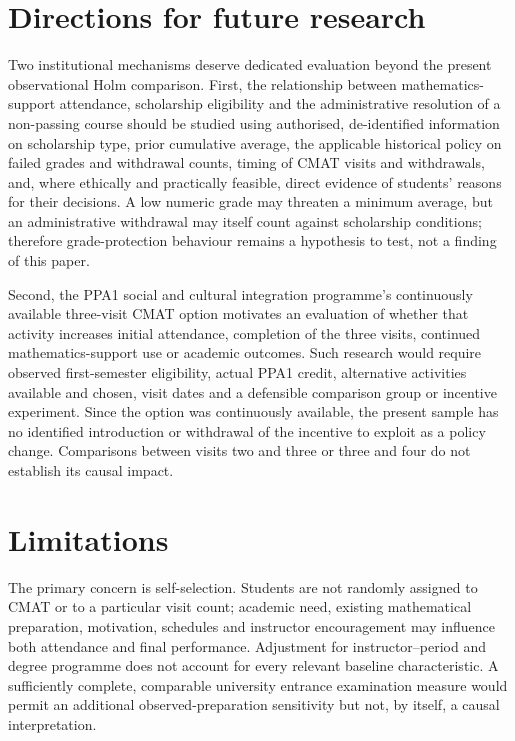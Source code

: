 \section{Directions for future research}

Two institutional mechanisms deserve dedicated evaluation beyond the present observational Holm comparison. First, the relationship between mathematics-support attendance, scholarship eligibility and the administrative resolution of a non-passing course should be studied using authorised, de-identified information on scholarship type, prior cumulative average, the applicable historical policy on failed grades and withdrawal counts, timing of CMAT visits and withdrawals, and, where ethically and practically feasible, direct evidence of students' reasons for their decisions. A low numeric grade may threaten a minimum average, but an administrative withdrawal may itself count against scholarship conditions; therefore grade-protection behaviour remains a hypothesis to test, not a finding of this paper.

Second, the PPA1 social and cultural integration programme's continuously available three-visit CMAT option motivates an evaluation of whether that activity increases initial attendance, completion of the three visits, continued mathematics-support use or academic outcomes. Such research would require observed first-semester eligibility, actual PPA1 credit, alternative activities available and chosen, visit dates and a defensible comparison group or incentive experiment. Since the option was continuously available, the present sample has no identified introduction or withdrawal of the incentive to exploit as a policy change. Comparisons between visits two and three or three and four do not establish its causal impact.

\section{Limitations}

The primary concern is self-selection. Students are not randomly assigned to CMAT or to a particular visit count; academic need, existing mathematical preparation, motivation, schedules and instructor encouragement may influence both attendance and final performance. Adjustment for instructor--period and degree programme does not account for every relevant baseline characteristic. A sufficiently complete, comparable university entrance examination measure would permit an additional observed-preparation sensitivity but not, by itself, a causal interpretation.

